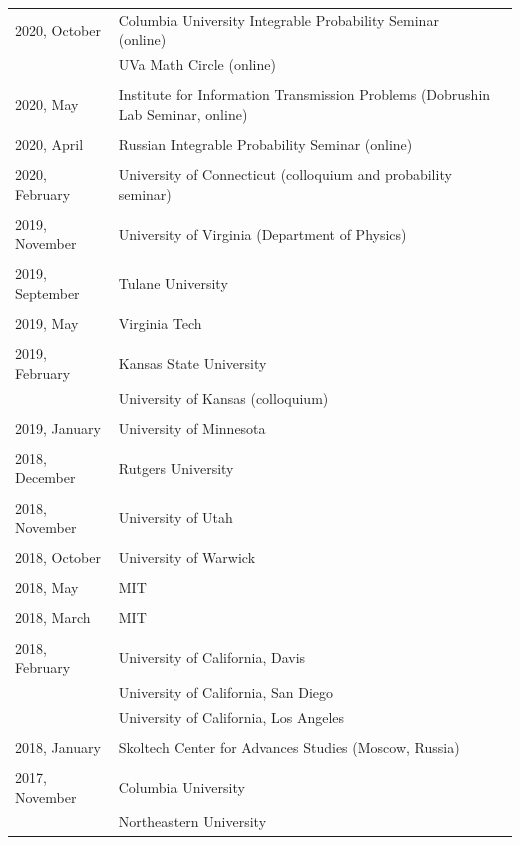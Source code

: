\documentclass[letterpaper,11pt]{article}
\begin{document}
\begin{longtable}{llc}
	2020, October
	& Columbia University Integrable Probability Seminar (online)
	\\
	&
	UVa Math Circle (online)
	\\\\
	2020, May
	& Institute for Information Transmission Problems
	(Dobrushin Lab Seminar, online)
	\\\\
	2020, April
	& Russian Integrable Probability Seminar (online)
	\\\\
	2020, February
	& University of Connecticut (colloquium and probability seminar)
	\\\\
	2019, November
	& University of Virginia (Department of Physics)
	\\\\
	2019, September
	& Tulane University
	\\\\
	2019, May
	& Virginia Tech
	\\\\
	2019, February
	& Kansas State University \\
	& University of Kansas (colloquium)
	\\\\
	2019, January
	& University of Minnesota
	\\\\
	2018, December
	& Rutgers University
	\\\\
	2018, November
	& University of Utah
	\\\\
	2018, October
	& University of Warwick
	\\\\
	2018, May
	& MIT
	\\\\
	2018, March
	& MIT
	\\\\
	2018, February
	& University of California, Davis
	\\
	& University of California, San Diego
	\\
	& University of California, Los Angeles
	\\\\
	2018, January
	& Skoltech Center for Advances Studies (Moscow, Russia)
	\\\\
	2017, November
	& Columbia University
	\\
	& Northeastern University

\end{longtable}
\end{document}
